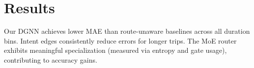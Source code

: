 \section{Results}
Our DGNN achieves lower MAE than route-unaware baselines across all duration bins. Intent edges consistently reduce errors for longer trips. The MoE router exhibits meaningful specialization (measured via entropy and gate usage), contributing to accuracy gains.
